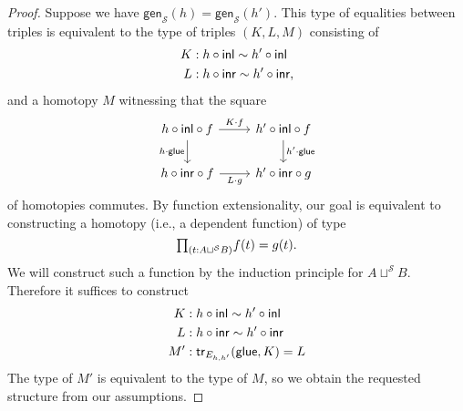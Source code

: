 \begin{proof}
Suppose we have $\mathsf{gen}_{\mathcal{S}}(h)=\mathsf{gen}_{\mathcal{S}}(h')$. This type of equalities between triples is equivalent to the type of triples $(K,L,M)$ consisting of
\begin{align*}
K & : h\circ {\mathsf{inl}} \sim h'\circ {\mathsf{inl}} \\
L & : h\circ {\mathsf{inr}} \sim h'\circ {\mathsf{inr}},
\end{align*}
and a homotopy $M$ witnessing that the square 
\begin{equation*}
\begin{tikzcd}
h\circ \inl\circ f \arrow[r,"{K\cdot f}"] \arrow[d,swap,"{h\cdot\glue}"] & h'\circ\inl\circ f \arrow[d,"{h'\cdot\glue}"] \\
h\circ \inr\circ f \arrow[r,swap,"{L\cdot g}"] & h'\circ\inr\circ g
\end{tikzcd}
\end{equation*}
of homotopies commutes. By function extensionality, our goal is equivalent to constructing a homotopy (i.e., a dependent function) of type
\begin{equation*}
\prd{t:A\sqcup^{\mathcal{S}} B} f(t)=g(t).
\end{equation*}
We will construct such a function by the induction principle for $A\sqcup^{\mathcal{S}} B$. Therefore it suffices to construct
\begin{align*}
K & : h\circ {\mathsf{inl}} \sim h'\circ {\mathsf{inl}} \\
L & : h\circ {\mathsf{inr}} \sim h'\circ {\mathsf{inr}} \\
M' & : \mathsf{tr}_{E_{h,h'}}(\mathsf{glue},K)=L
\end{align*}
The type of $M'$ is equivalent to the type of $M$, so we obtain the requested structure from our assumptions.
\end{proof}

